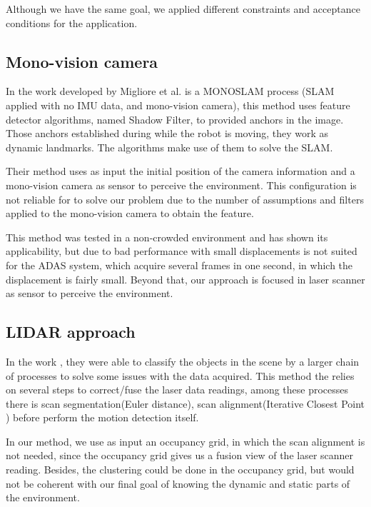Although we have the same goal, we applied different constraints and acceptance conditions for the application. 

\subsection{Mono-vision camera}

In the work developed by Migliore et al. \cite{Migliore_2009_ICRA} is a MONOSLAM process (SLAM applied with no IMU data, and mono-vision camera), this method uses feature detector algorithms, named Shadow Filter, to provided anchors in the image. Those anchors established during while the robot is moving, they work as dynamic landmarks. The algorithms make use of them to solve the SLAM.

Their method uses as input the initial position of the camera information and a mono-vision camera as sensor to perceive the environment. This configuration is not reliable for to solve our problem due to the number of assumptions and filters applied to the mono-vision camera to obtain the feature.

This method was tested in a non-crowded environment and has shown its applicability, but due to bad performance with small displacements is not suited for the ADAS system, which acquire several frames in one second, in which the displacement is fairly small. Beyond that, our approach is focused in laser scanner as sensor to perceive the environment.

\subsection{LIDAR approach}

In the work \cite{4650636}, they were able to classify the objects in the scene by a larger chain of processes to solve some issues with the data acquired. This method the relies on several steps to correct/fuse the laser data readings, among these processes there is scan segmentation(Euler distance), scan alignment(Iterative Closest Point \cite{10.1109/34.121791}) before perform the motion detection itself. 


In our method, we use as input an occupancy grid, in which the scan alignment is not needed, since the occupancy grid gives us a fusion view of the laser scanner reading. Besides, the clustering could be done in the occupancy grid, but would not be coherent with our final goal of knowing the dynamic and static parts of the environment.


